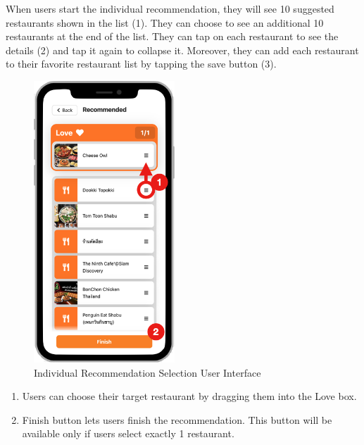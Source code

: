 \documentclass[12pt,oneside,openright,a4paper]{cpe-english-project}
\begin{document}
When users start the individual recommendation, they will see 10 suggested restaurants shown in the list (1). They can choose to see an additional 10 restaurants at the end of the list. They can tap on each restaurant to see the details (2) and tap it again to collapse it. Moreover, they can add each restaurant to their favorite restaurant list by tapping the save button (3).
\begin{figure}[H]\centering
\includegraphics[height=300pt]{./images/4ui_IndividualRecommendationSelectionUserInterface.png}
\caption{Individual Recommendation Selection User Interface}\label{fig:4ui_IndividualRecommendationSelectionUserInterface}
\end{figure}\vspace{-24pt}

\begin{enumerate}
\item Users can choose their target restaurant by dragging them into the Love box.
\item Finish button lets users finish the recommendation. This button will be available only if users select exactly 1 restaurant.
\end{enumerate}
\end{document}
